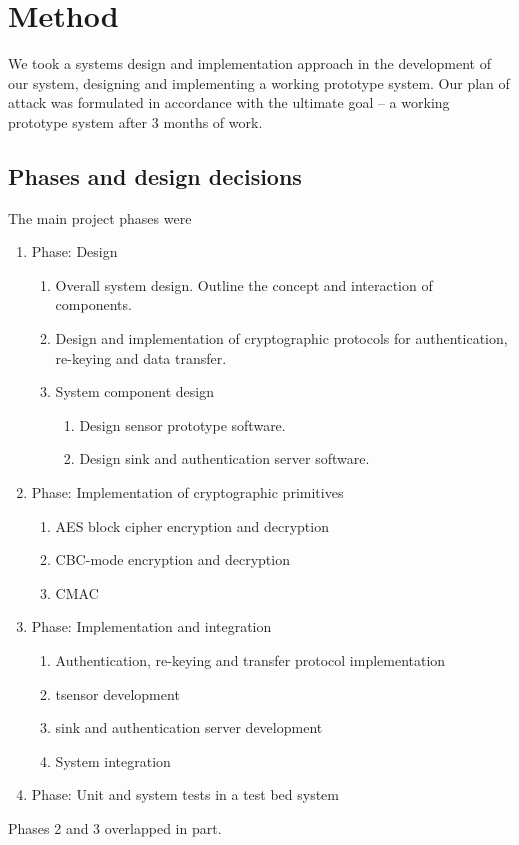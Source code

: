 \chapter{Method}

We took a systems design and implementation approach in the development of our system, designing and implementing a working prototype system. Our plan of attack was formulated in accordance with the ultimate goal -- a working prototype system after 3 months of work. 

\section{Phases and design decisions}

The main project phases were
%
\begin{enumerate}

\item Phase: Design
\begin{enumerate}
\item Overall system design. Outline the concept and interaction of components.
\item Design and implementation of cryptographic protocols for authentication, re-keying and data transfer.
\item System component design
\begin{enumerate}
\item Design sensor prototype software.
\item Design sink and authentication server software.
\end{enumerate}
\end{enumerate}

\item Phase: Implementation of cryptographic primitives
\begin{enumerate}
\item AES block cipher encryption and decryption
\item CBC-mode encryption and decryption
\item CMAC
\end{enumerate}

\item Phase: Implementation and integration
\begin{enumerate}
\item Authentication, re-keying and transfer protocol implementation
\item tsensor development
\item sink and authentication server development
\item System integration
\end{enumerate}

\item Phase: Unit and system tests in a test bed system

\end{enumerate}
%
Phases 2 and 3 overlapped in part.


